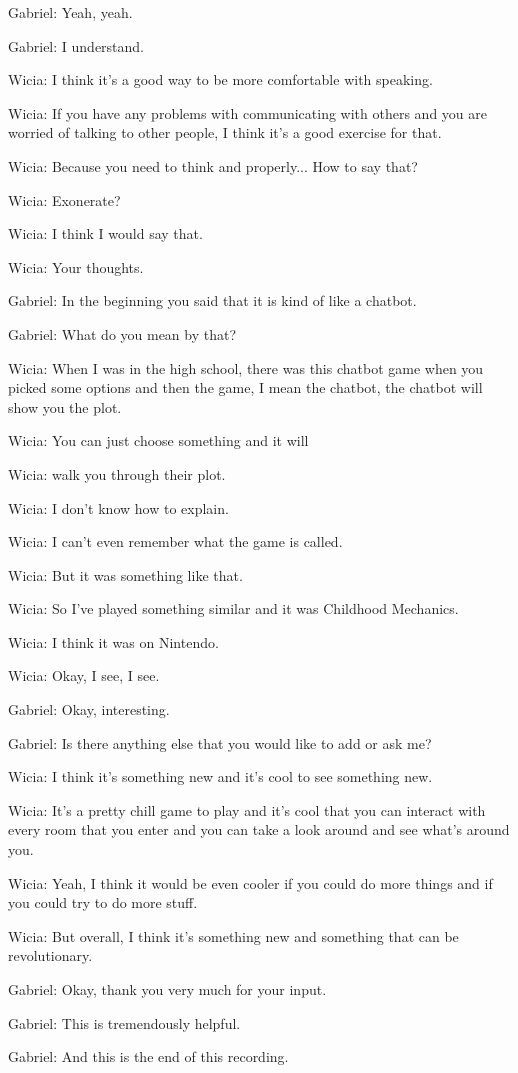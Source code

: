Gabriel: Yeah, yeah.

Gabriel: I understand.

Wicia: I think it's a good way to be more comfortable with speaking.

Wicia: If you have any problems with communicating with others and you are worried of talking to other people, I think it's a good exercise for that.

Wicia: Because you need to think and properly... How to say that?

Wicia: Exonerate?

Wicia: I think I would say that.

Wicia: Your thoughts.

Gabriel: In the beginning you said that it is kind of like a chatbot.

Gabriel: What do you mean by that?

Wicia: When I was in the high school, there was this chatbot game when you picked some options and then the game, I mean the chatbot, the chatbot will show you the plot.

Wicia: You can just choose something and it will

Wicia: walk you through their plot.

Wicia: I don't know how to explain.

Wicia: I can't even remember what the game is called.

Wicia: But it was something like that.

Wicia: So I've played something similar and it was Childhood Mechanics.

Wicia: I think it was on Nintendo.

Wicia: Okay, I see, I see.

Gabriel: Okay, interesting.

Gabriel: Is there anything else that you would like to add or ask me?

Wicia: I think it's something new and it's cool to see something new.

Wicia: It's a pretty chill game to play and it's cool that you can interact with every room that you enter and you can take a look around and see what's around you.

Wicia: Yeah, I think it would be even cooler if you could do more things and if you could try to do more stuff.

Wicia: But overall, I think it's something new and something that can be revolutionary.

Gabriel: Okay, thank you very much for your input.

Gabriel: This is tremendously helpful.

Gabriel: And this is the end of this recording.






